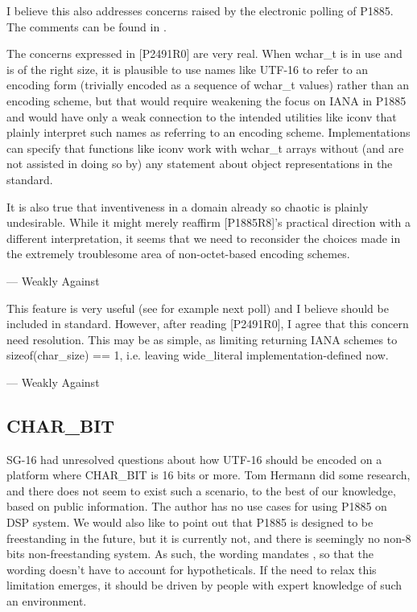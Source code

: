 \documentclass{wg21}
\begin{document}
I believe this also addresses concerns raised by the electronic polling of P1885. The comments can be found in .

\begin{quoteblock}
    The concerns expressed in [P2491R0] are very real. When wchar_t is in use and is of the right size, it is plausible to use names like UTF-16 to refer to an encoding form (trivially encoded as a sequence of wchar_t values) rather than an encoding scheme, but that would require weakening the focus on IANA in P1885 and would have only a weak connection to the intended utilities like iconv that plainly interpret such names as referring to an encoding scheme. Implementations can specify that functions like iconv work with wchar_t arrays without (and are not assisted in doing so by) any statement about object representations in the standard.

    It is also true that inventiveness in a domain already so chaotic is plainly undesirable. While it might merely reaffirm [P1885R8]'s practical direction with a different interpretation, it seems that we need to reconsider the choices made in the extremely troublesome area of non-octet-based encoding schemes.

    — Weakly Against
\end{quoteblock}

\begin{quoteblock}
    This feature is very useful (see for example next poll) and I believe should be included in standard. However, after reading [P2491R0], I agree that this concern need resolution. This may be as simple, as limiting returning IANA schemes to sizeof(char_size) == 1, i.e. leaving wide_literal implementation-defined now.

    — Weakly Against
\end{quoteblock}


\subsection{CHAR_BIT}
SG-16 had unresolved questions about how UTF-16 should be encoded on a platform where CHAR_BIT is 16 bits or more.
Tom Hermann did some research, and there does not seem to exist such a scenario, to the best of our knowledge, based on public information.
The author has no use cases for using P1885 on DSP system.
We would also like to point out that P1885 is designed to be freestanding in the future, but it is currently not, and there is seemingly no non-8 bits
non-freestanding system.
As such, the wording mandates , so that the wording doesn't have to account for hypotheticals.
If the need to relax this limitation emerges, it should be driven by people with expert knowledge of such an environment.
\end{document}
